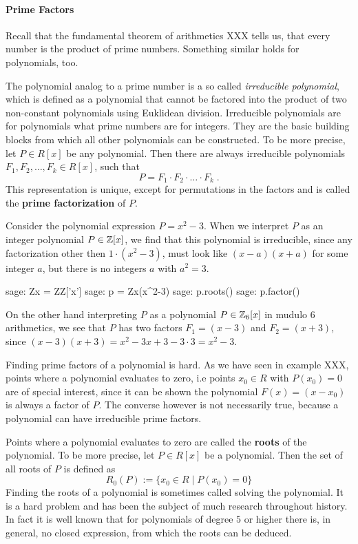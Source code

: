 \paragraph{Prime Factors} Recall that the fundamental theorem of arithmetics XXX tells us, that every number is the product of prime numbers. Something similar holds for polynomials, too. 

The polynomial analog to a prime number is a so called \textit{irreducible polynomial}, which is defined as a polynomial that cannot be factored into the product of two non-constant polynomials using Euklidean division. Irreducible polynomials are for polynomials what prime numbers are for integers. They are the basic building blocks from which all other polynomials can be constructed. To be more precise, let $P \in R[x]$ be any polynomial. Then there are always irreducible polynomials $F_1, F_2, \ldots, F_k \in R[x]$, such that
\begin{equation}
P = F_1 \cdot F_2 \cdot \ldots \cdot F_k \;.
\end{equation}
This representation is unique, except for permutations in the factors and is called the \textbf{prime factorization} of $P$.
\begin{example} Consider the polynomial expression $P=x^2-3$. When we interpret $P$ as an integer polynomial $P\in\mathbb{Z}[x]$, we find that this polynomial is irreducible, since any factorization other then $1\cdot(x^2-3)$, must look like $(x-a)(x+a)$ for some integer $a$, but there is no integers $a$ with $a^2=3$. 
\begin{sagecommandline}
sage: Zx = ZZ['x']
sage: p = Zx(x^2-3)
sage: p.roots()
sage: p.factor()
\end{sagecommandline}
On the other hand interpreting $P$ as a polynomial $P\in \mathbb{Z}_6[x]$ in mudulo $6$ arithmetics, we see that $P$ has two factors $F_1=(x-3)$ and $F_2=(x+3)$, since 
$(x-3)(x+3)= x^2 -3x +3 -3\cdot 3= x^2-3$. 
\end{example}
Finding prime factors of a polynomial is hard. As we have seen in example XXX, points where a polynomial evaluates to zero, i.e points $x_0\in R$ with $P(x_0)=0$ are of special interest, since it can be shown the polynomial $F(x)=(x-x_0)$ is always a factor of $P$. The converse however is not necessarily true, because a polynomial can have irreducible prime factors. 

Points where a polynomial evaluates to zero are called the \textbf{roots} of the polynomial. To be more precise, let $P\in R[x]$ be a polynomial. Then the set of all roots of $P$ is defined as
\begin{equation}
R_0(P):=\{x_0\in R\;|\; P(x_0)=0\}
\end{equation}
Finding the roots of a polynomial is sometimes called solving the polynomial. It is a hard problem and has been the subject of much research throughout history. In fact it is well known that for polynomials of degree $5$ or higher there is, in general, no closed expression, from which the roots can be deduced. 

